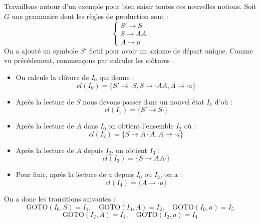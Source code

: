 \begin{example}
    Travaillons autour d'un exemple pour bien saisir toutes ces nouvelles notions. 
    Soit $G$ une grammaire dont les règles de production sont : 
        \[ 
            \begin{cases}
                S' \to S \\ 
                S \to AA \\ 
                A \to a 
            \end{cases}
        \] 
    On a ajouté un symbole $S'$ fictif pour avoir un axiome de départ unique. 
    Comme vu précédement, commençons par calculer les clôtures : 
    \begin{itemize}
        \item On calcule la clôture de $I_0$ qui donne : 
            $$ cl(I_0) = \{S' \to \cdot S, S \to \cdot AA, A \to \cdot a\}$$ 
        \item Après la lecture de $S$ nous devons passer dans un nouvel état $I_1$ d'où : 
            $$ cl(I_1) = \{S' \to S \cdot\} $$ 
        \item Après la lecture de $A$ dans $I_0$ on obtient l'ensemble $I_2$ où : 
            $$ cl(I_2) = \{S \to A \cdot A, A \to \cdot a\} $$ 
        \item Après la lecture de $A$ depuis $I_2$, on obtient $I_3$ : 
            $$ cl(I_3) = \{S \to AA \cdot\} $$ 
        \item Pour finir, après la lecture de $a$ depuis $I_0$ ou $I_2$, on a : 
            $$ cl(I_4) = \{A \to \cdot a\} $$
    \end{itemize}
    On a donc les transitions suivantes : 
        $$ \text{GOTO}(I_0, S) = I_1, \quad \text{GOTO}(I_0, A) = I_2, \quad \text{GOTO}(I_0, a) = I_5 $$ 
        $$ \text{GOTO}(I_2, A) = I_4, \quad \text{GOTO}(I_2, a) = I_4 $$ 


\end{example}
